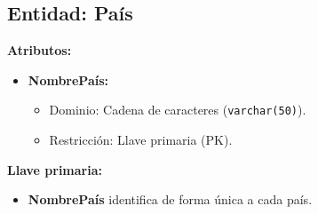 \subsection*{Entidad: País}
\textbf{Atributos:}
\begin{itemize}
    \item \textbf{NombrePaís:}
    \begin{itemize}
        \item Dominio: Cadena de caracteres (\texttt{varchar(50)}).
        \item Restricción: Llave primaria (PK).
    \end{itemize}
\end{itemize}
\textbf{Llave primaria:}
\begin{itemize}
    \item \textbf{NombrePaís} identifica de forma única a cada país.
\end{itemize}


